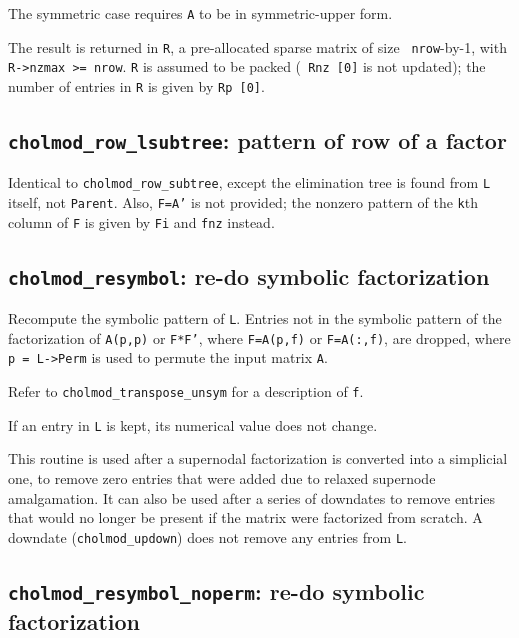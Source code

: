 \documentclass[11pt]{article}
\begin{document}
The symmetric case requires {\tt A} to be in symmetric-upper form.

The result is returned in {\tt R}, a pre-allocated sparse matrix of size {\tt
nrow}-by-1, with {\tt R->nzmax >= nrow}.  {\tt R} is assumed to be packed ({\tt
Rnz [0]} is not updated); the number of entries in {\tt R} is given by {\tt Rp
[0]}.

\subsection{{\tt cholmod\_row\_lsubtree}: pattern of row of a factor}


Identical to {\tt cholmod\_row\_subtree}, except the elimination tree is found
from {\tt L} itself, not {\tt Parent}.  Also, {\tt F=A'} is not provided; the
nonzero pattern of the {\tt k}th column of {\tt F} is given by {\tt Fi} and
{\tt fnz} instead.

\subsection{{\tt cholmod\_resymbol}: re-do symbolic factorization}


Recompute the symbolic pattern of {\tt L}.  Entries not in the symbolic pattern
of the factorization of {\tt A(p,p)} or {\tt F*F'}, where {\tt F=A(p,f)} or
{\tt F=A(:,f)}, are dropped, where {\tt p = L->Perm} is used to permute the
input matrix {\tt A}.

Refer to {\tt cholmod\_transpose\_unsym} for a description of {\tt f}.

If an entry in {\tt L} is kept, its numerical value does not change.

This routine is used after a supernodal factorization is converted into a
simplicial one, to remove zero entries that were added due to relaxed supernode
amalgamation.  It can also be used after a series of downdates to remove
entries that would no longer be present if the matrix were factorized from
scratch.  A downdate ({\tt cholmod\_updown}) does not remove any entries from
{\tt L}.

\subsection{{\tt cholmod\_resymbol\_noperm}: re-do symbolic factorization}
\end{document}
